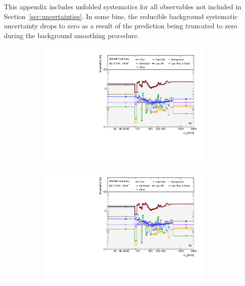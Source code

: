 This appendix includes unfolded systematics for all observables not included in Section~\ref{sec:uncertainties}. In some bins, the reducible background systematic uncertainty drops to zero as a result of the prediction being truncated to zero during the background smoothing procedure.


\begin{figure}[hp]
    \centering
    \begin{subfigure}{.49\textwidth}\centering\includegraphics[width = 0.95\textwidth]{Figures/m4l/Systematics/Unfolded/UnfoldedSys_M4lvChannel_Stack_Paper0.pdf}\end{subfigure}
    \begin{subfigure}{.49\textwidth}\centering\includegraphics[width = 0.95\textwidth]{Figures/m4l/Systematics/Unfolded/UnfoldedSys_M4lvChannel_Stack_Paper0.pdf}\end{subfigure}

\end{figure}
